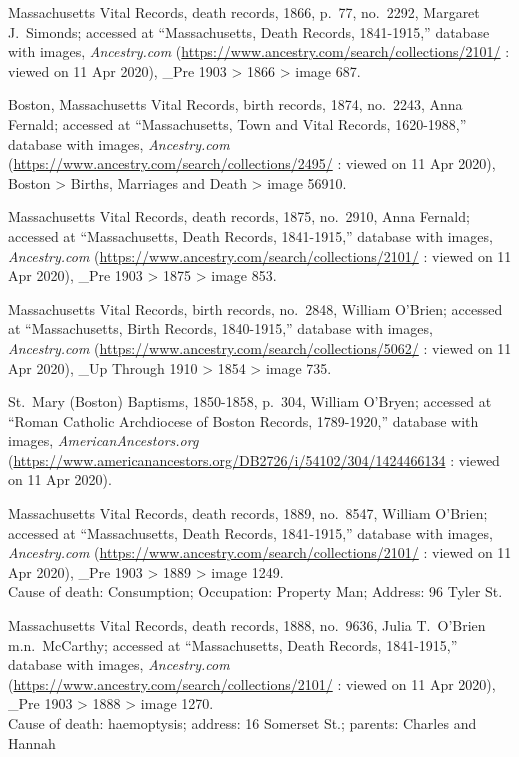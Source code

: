 \begin{thebibliography}{999}
	Massachusetts Vital Records, death records, 1866, p.\ 77, no.\ 2292, Margaret J.\ Simonds; accessed at ``Massachusetts, Death Records, 1841-1915,'' database with images, \textit{Ancestry.com} (\url{https://www.ancestry.com/search/collections/2101/} : viewed on 11 Apr 2020), \_Pre 1903 > 1866 > image 687.
	
	Boston, Massachusetts Vital Records, birth records, 1874, no.\ 2243, Anna Fernald; accessed at ``Massachusetts, Town and Vital Records, 1620-1988,'' database with images, \textit{Ancestry.com} (\url{https://www.ancestry.com/search/collections/2495/} : viewed on 11 Apr 2020), Boston > Births, Marriages and Death > image 56910.
	
	Massachusetts Vital Records, death records, 1875, no.\ 2910, Anna Fernald; accessed at ``Massachusetts, Death Records, 1841-1915,'' database with images, \textit{Ancestry.com} (\url{https://www.ancestry.com/search/collections/2101/} : viewed on 11 Apr 2020), \_Pre 1903 > 1875 > image 853.
	
	Massachusetts Vital Records, birth records, no.\ 2848, William O'Brien; accessed at ``Massachusetts, Birth Records, 1840-1915,'' database with images, \textit{Ancestry.com} (\url{https://www.ancestry.com/search/collections/5062/} : viewed on 11 Apr 2020), \_Up Through 1910 > 1854 > image 735.
	
	St.\ Mary (Boston) Baptisms, 1850-1858, p.\ 304, William O'Bryen; accessed at ``Roman Catholic Archdiocese of Boston Records, 1789-1920,'' database with images, \textit{AmericanAncestors.org} (\url{https://www.americanancestors.org/DB2726/i/54102/304/1424466134} : viewed on 11 Apr 2020).	
	
	Massachusetts Vital Records, death records, 1889, no.\ 8547, William O'Brien; accessed at ``Massachusetts, Death Records, 1841-1915,'' database with images, \textit{Ancestry.com} (\url{https://www.ancestry.com/search/collections/2101/} : viewed on 11 Apr 2020), \_Pre 1903 > 1889 > image 1249.\\
	Cause of death: Consumption; Occupation: Property Man; Address: 96 Tyler St.
	
	Massachusetts Vital Records, death records, 1888, no.\ 9636, Julia T.\ O'Brien m.n.\ McCarthy; accessed at ``Massachusetts, Death Records, 1841-1915,'' database with images, \textit{Ancestry.com} (\url{https://www.ancestry.com/search/collections/2101/} : viewed on 11 Apr 2020), \_Pre 1903 > 1888 > image 1270.\\
	Cause of death: haemoptysis; address: 16 Somerset St.; parents: Charles and Hannah
	

\end{thebibliography}
